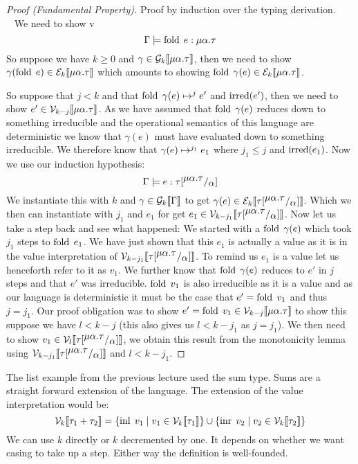 \begin{proof}[Proof (Fundamental Property)]
Proof by induction over the typing derivation.
\case{\TFold} \\~
We need to show 
\newcommand{\mat}{\ensuremath{\mu\alpha.\tau}}
v\[
  \Gamma \models \fold \; e : \mat
\]
So suppose we have $k \geq 0$ and $\gamma \in \gpres{\mat}$, then we need to show $\gamma(\fold\; e) \in \epres{\mat}$ which amounts to showing $\fold\; \gamma(e) \in \epres{\mat}$.

So suppose that $j<k$ and that $\fold\; \gamma(e) \evaltos[j] e'$ and $\irred(e')$, then we need to show $e' \in \vpres[k-j]{\mat}$. As we have assumed that $\fold\; \gamma(e)$ reduces down to something irreducible and the operational semantics of this language are deterministic we know that $\gamma(e)$ must have evaluated down to something irreducible. We therefore know that $\gamma(e) \evaltos[j_1] e_1$ where $j_1 \leq j$ and $\irred(e_1)$.
Now we use our induction hypothesis:
\newcommand{\tsub}{\ensuremath{\sub{\tau}{\mat}{\alpha}}}
\[
  \Gamma \models e : \tsub
\]
We instantiate this with $k$ and $\gamma \in \gpres{\Gamma}$ to get $\gamma(e) \in \epres{\tsub}$. Which we then can instantiate with $j_1$ and $e_1$ for get $e_1 \in \vpres[k-j_1]{\tsub}$. Now let us take a step back and see what happened: We started with a $\fold\; \gamma(e)$ which took $j_1$ steps to $\fold\; e_1$. We have just shown that this $e_1$ is actually a value as it is in the value interpretation of $\vpres[k-j_1]{\tsub}$. To remind us $e_1$ is a value let us henceforth refer to it as $v_1$. We further know that $\fold\; \gamma(e)$ reduces to $e'$ in $j$ steps and that $e'$ was irreducible. $\fold\; v_1$ is also irreducible as it is a value and as our language is deterministic it must be the case that $e' = \fold\; v_1$ and thus $j = j_1$. Our proof obligation was to show $e' = \fold \; v_1 \in \vpres[k-j]{\mat}$ to show this suppose we have $l < k-j$ (this also gives us $l < k-j_1$ as $j = j_1$). We then need to show $v_1 \in \vpres[l]{\tsub}$, we obtain this result from the monotonicity lemma using $\vpres[k-j_1]{\tsub}$ and $l < k-j_1$.
\end{proof}

The list example from the previous lecture used the sum type. Sums are a straight forward extension of the language. The extension of the value interpretation would be:
\[
  \vpres{\tau_1 + \tau_2} = \{\inl \; v_1 \vbar v_1 \in \vpres{\tau_1}\} \cup 
                            \{\inr \; v_2 \vbar v_2 \in \vpres{\tau_2}\}
\]
We can use $k$ directly or $k$ decremented by one. It depends on whether we want casing to take up a step. Either way the definition is well-founded. 

